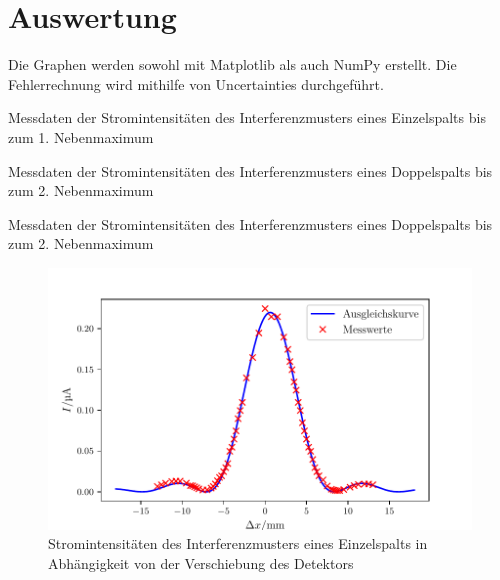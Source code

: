 \section{Auswertung}
\label{sec:Auswertung}


Die Graphen werden sowohl mit Matplotlib \cite{matplotlib} als auch NumPy \cite{numpy} erstellt. Die Fehlerrechnung wird mithilfe von Uncertainties \cite{uncertainties} durchgeführt.


\begin{table}
	\centering
	\caption{Messdaten der Stromintensitäten des Interferenzmusters eines Einzelspalts bis zum 1. Nebenmaximum}
	
	\label{tab:1}
\end{table}


\begin{table}
	\centering
	\caption{Messdaten der Stromintensitäten des Interferenzmusters eines Doppelspalts bis zum 2. Nebenmaximum}
	
	\label{tab:2}
\end{table}

\begin{table}
	\centering
	\caption{Messdaten der Stromintensitäten des Interferenzmusters eines Doppelspalts bis zum 2. Nebenmaximum}
	
	\label{tab:3}
\end{table}

\begin{figure}
\centering
\includegraphics[width=\linewidth-70pt,height=\textheight-70pt,keepaspectratio]{content/images/Einzelspalt.pdf}
\caption{Stromintensitäten des Interferenzmusters eines Einzelspalts in Abhängigkeit von der Verschiebung des Detektors}
\label{fig:Einzel}
\end{figure}

